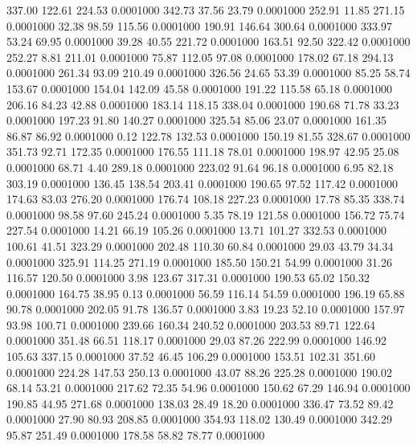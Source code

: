  337.00  122.61  224.53   0.0001000
 342.73   37.56   23.79   0.0001000
 252.91   11.85  271.15   0.0001000
  32.38   98.59  115.56   0.0001000
 190.91  146.64  300.64   0.0001000
 333.97   53.24   69.95   0.0001000
  39.28   40.55  221.72   0.0001000
 163.51   92.50  322.42   0.0001000
 252.27    8.81  211.01   0.0001000
  75.87  112.05   97.08   0.0001000
 178.02   67.18  294.13   0.0001000
 261.34   93.09  210.49   0.0001000
 326.56   24.65   53.39   0.0001000
  85.25   58.74  153.67   0.0001000
 154.04  142.09   45.58   0.0001000
 191.22  115.58   65.18   0.0001000
 206.16   84.23   42.88   0.0001000
 183.14  118.15  338.04   0.0001000
 190.68   71.78   33.23   0.0001000
 197.23   91.80  140.27   0.0001000
 325.54   85.06   23.07   0.0001000
 161.35   86.87   86.92   0.0001000
   0.12  122.78  132.53   0.0001000
 150.19   81.55  328.67   0.0001000
 351.73   92.71  172.35   0.0001000
 176.55  111.18   78.01   0.0001000
 198.97   42.95   25.08   0.0001000
  68.71    4.40  289.18   0.0001000
 223.02   91.64   96.18   0.0001000
   6.95   82.18  303.19   0.0001000
 136.45  138.54  203.41   0.0001000
 190.65   97.52  117.42   0.0001000
 174.63   83.03  276.20   0.0001000
 176.74  108.18  227.23   0.0001000
  17.78   85.35  338.74   0.0001000
  98.58   97.60  245.24   0.0001000
   5.35   78.19  121.58   0.0001000
 156.72   75.74  227.54   0.0001000
  14.21   66.19  105.26   0.0001000
  13.71  101.27  332.53   0.0001000
 100.61   41.51  323.29   0.0001000
 202.48  110.30   60.84   0.0001000
  29.03   43.79   34.34   0.0001000
 325.91  114.25  271.19   0.0001000
 185.50  150.21   54.99   0.0001000
  31.26  116.57  120.50   0.0001000
   3.98  123.67  317.31   0.0001000
 190.53   65.02  150.32   0.0001000
 164.75   38.95    0.13   0.0001000
  56.59  116.14   54.59   0.0001000
 196.19   65.88   90.78   0.0001000
 202.05   91.78  136.57   0.0001000
   3.83   19.23   52.10   0.0001000
 157.97   93.98  100.71   0.0001000
 239.66  160.34  240.52   0.0001000
 203.53   89.71  122.64   0.0001000
 351.48   66.51  118.17   0.0001000
  29.03   87.26  222.99   0.0001000
 146.92  105.63  337.15   0.0001000
  37.52   46.45  106.29   0.0001000
 153.51  102.31  351.60   0.0001000
 224.28  147.53  250.13   0.0001000
  43.07   88.26  225.28   0.0001000
 190.02   68.14   53.21   0.0001000
 217.62   72.35   54.96   0.0001000
 150.62   67.29  146.94   0.0001000
 190.85   44.95  271.68   0.0001000
 138.03   28.49   18.20   0.0001000
 336.47   73.52   89.42   0.0001000
  27.90   80.93  208.85   0.0001000
 354.93  118.02  130.49   0.0001000
 342.29   95.87  251.49   0.0001000
 178.58   58.82   78.77   0.0001000
